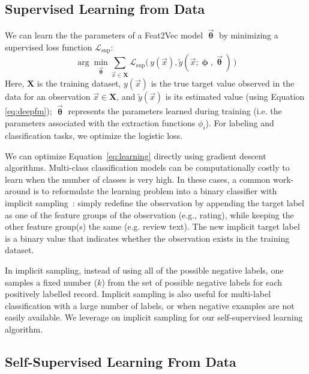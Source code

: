 \documentclass[letterpaper]{article}
\newcommand{\vect}[1]{\vec{#1}}
\begin{document}
\subsection{Supervised Learning from Data}
\label{sec:learning_supervised}

We can learn the the parameters of a Feat2Vec model $  \vect{\bm\uptheta}$  by minimizing a supervised loss function $\mathcal L_\text{sup}$:
\label{sec:learning}
\begin{equation}
\arg \min_{ \vect{\bm\uptheta}} \sum_{\vect{x} \in \mathbf{X}}  \mathcal{L}_\text{sup}\bigl( \, y(\vect{x}), \tilde y(\vect{x};{\bm \upphi,  \vect{\bm\uptheta}}) \, \bigr)
\label{eq:learning}
\end{equation}
Here, $\mathbf X$ is the training dataset, $y(\vect{x})$  is the true target value observed in the data for an observation $\vect{x} \in \mathbf{X}$, and $\tilde {y}(\vect{x})$ is its estimated value (using Equation \ref{eq:deepfm});
$ \vect{\bm\uptheta}$ represents the parameters learned  during training (i.e. the parameters associated with the extraction functions $\phi_i$).
For labeling and classification tasks, we optimize the logistic loss.

We can optimize Equation~\ref{eq:learning} directly using gradient descent algorithms.
Multi-class classification models can be computationally costly to learn when the number of classes is very high.
In these cases, a common work-around is to  reformulate the learning problem into a binary classifier with implicit sampling~\cite{samplingnotes}:
simply redefine the observation by appending the target label  as one of the feature groups of the observation (e.g., rating), while keeping the other feature group(s) the same (e.g. review text).
The new implicit target label is a binary value that indicates whether the observation exists in the training dataset.

In implicit sampling, instead of using all of the possible negative labels, one samples a fixed number ($k$) from the set of possible negative labels for each positively labelled record.
Implicit sampling is also useful for multi-label classification with a large number of labels, or when negative examples are not easily available.
We leverage on implicit sampling for our self-supervised learning algorithm.

\subsection{Self-Supervised Learning From Data}
\label{sec:sampling}
\end{document}
